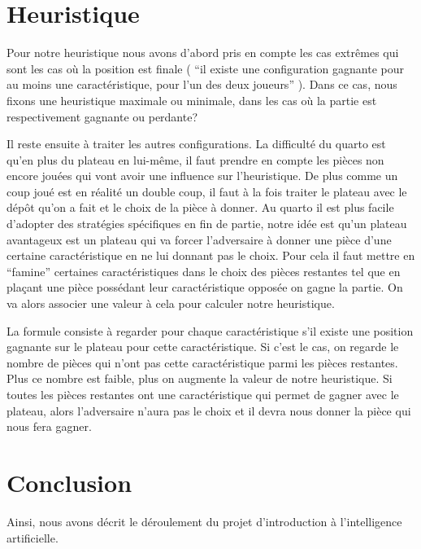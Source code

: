 \documentclass{article}
\begin{document}
\section{Heuristique}
Pour notre heuristique nous avons d'abord pris en compte les cas 
extrêmes qui sont les cas o\`u la position est finale
( ``il existe une configuration gagnante pour au moins une
caractéristique, pour l'un des deux joueurs'' ).
Dans ce cas, nous fixons une heuristique maximale ou minimale, dans
les cas o\`u la partie est respectivement gagnante ou perdante?


Il reste ensuite à traiter les autres configurations.
La difficulté du quarto est qu'en plus du plateau en lui-même,
il faut prendre en compte les pièces
non encore jouées qui vont avoir une influence sur l'heuristique.
De plus comme un coup joué est en réalité un double coup, il faut à la fois
traiter le plateau avec le dépôt qu'on a fait et le choix de la pièce
à donner.
Au quarto il est plus facile d'adopter des stratégies
spécifiques en fin de partie, notre idée est qu’un plateau avantageux
est un plateau qui va forcer l'adversaire à donner une pièce d'une
certaine caractéristique en ne lui donnant pas le choix. Pour cela il
faut mettre en ``famine'' certaines caractéristiques dans le choix des
pièces restantes tel que en plaçant une pièce possédant leur
caractéristique opposée on gagne la partie. On va alors associer une
valeur à cela pour calculer notre heuristique.


La formule consiste à regarder pour chaque caractéristique s’il existe
une position gagnante sur le plateau pour cette caractéristique. Si
c'est le cas, on regarde le nombre de pièces qui n'ont pas cette
caractéristique parmi les pièces restantes. Plus ce nombre est
faible, plus on augmente la valeur de notre heuristique.
Si toutes les pièces restantes ont une caractéristique qui permet
de gagner avec le
plateau, alors l'adversaire n'aura pas le choix et il devra nous
donner la pièce qui nous fera gagner.

\section{Conclusion}

Ainsi, nous avons décrit le déroulement du projet d'introduction à
l'intelligence artificielle.
\end{document}
